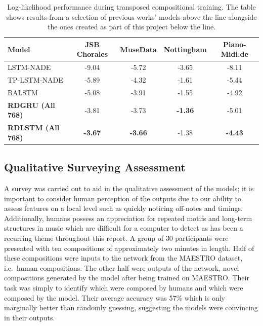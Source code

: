 \documentclass[12pt,]{article}
\begin{document}
\begin{table}[H]
\centering
\caption{Log-likelihood performance during transposed compositional training. The table shows results from a selection of previous works’ models above the line alongside the ones created as part of this project below the line.}
\vspace{1em}
\begin{tabular}{lcccc} 
\toprule
\textbf{Model}    & \textbf{JSB Chorales} & \textbf{MuseData} & \textbf{Nottingham} & \textbf{Piano-Midi.de}  \\ 
\midrule
LSTM-NADE         & -9.04                 & -5.72             & -3.65               & -8.11                   \\
TP-LSTM-NADE      & -5.89                 & -4.32             & -1.61               & -5.44                   \\
BALSTM            & -5.08                 & -3.91             & -1.55               & -4.92                   \\
\midrule
\textbf{RDGRU (All 768)}  & -3.81                 & -3.73             & \textbf{-1.36}      & -5.01                   \\
\textbf{RDLSTM (All 768)} & \textbf{-3.67}        & \textbf{-3.66}    & -1.38               & \textbf{-4.43}          \\
\bottomrule
\end{tabular}
\end{table}

\hypertarget{qualitative-surveying-assessment}{%
\subsection{Qualitative Surveying
Assessment}\label{qualitative-surveying-assessment}}

A survey was carried out to aid in the qualitative assessment of the
models; it is important to consider human perception of the outputs due
to our ability to assess features on a local level such as quickly
noticing off-notes and timings. Additionally, humans possess an
appreciation for repeated motifs and long-term structures in music which
are difficult for a computer to detect as has been a recurring theme
throughout this report. A group of 30 participants were presented with
ten compositions of approximately two minutes in length. Half of these
compositions were inputs to the network from the MAESTRO dataset,
i.e.~human compositions. The other half were outputs of the network,
novel compositions generated by the model after being trained on
MAESTRO. Their task was simply to identify which were composed by humans
and which were composed by the model. Their average accuracy was 57\%
which is only marginally better than randomly guessing, suggesting the
models were convincing in their outputs.
\end{document}

